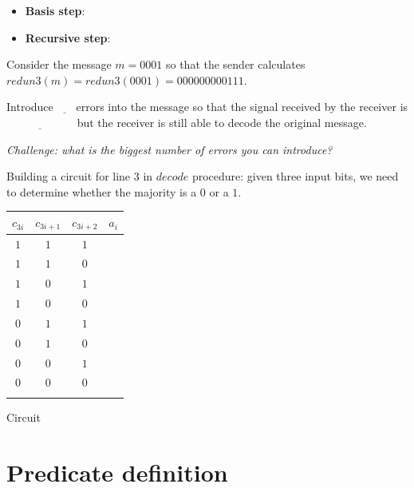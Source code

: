\documentclass[12pt, oneside]{article}
\begin{document}
\vspace{-20pt}

\begin{itemize}
\item[] {\bf Basis step}: \underline{ \phantom{$\lambda \in Out$ \qquad}}
\item[] {\bf Recursive step}: \underline{\phantom{If $x \in Out$ then $x000 \in Out$ and $x111 \in Out$} }
\end{itemize}


Consider the message $m = 0001$ so that the sender calculates $redun3(m) = redun3(0001) = 000000000111$.

Introduce $\underline{\phantom{~~4~~}} $
errors into the message so that the signal received by the 
receiver is $\underline{\phantom{010100010101}}$
but the receiver is still able to decode the original message.

\vspace{-10pt}

{\it Challenge: what is the biggest number of errors you can introduce?} 

Building a circuit for line 3 in $decode$ procedure: given three input bits, we need to determine whether the
majority is a $0$ or a $1$.

\begin{center}
\begin{multicols}{2}\begin{tabular}{ccc|c}
$c_{3i}$ & $c_{3i+1}$ & $c_{3i+2}$ & $a_i$ \\
\hline
$1$ & $1$ & $1$ & $\phantom{1}$ \\
$1$ & $1$ & $0$ & $\phantom{1}$ \\
$1$ & $0$ & $1$ & $\phantom{1}$ \\
$1$ & $0$ & $0$ & $\phantom{0}$ \\
$0$ & $1$ & $1$ & $\phantom{1}$ \\
$0$ & $1$ & $0$ & $\phantom{0}$ \\
$0$ & $0$ & $1$ & $\phantom{0}$ \\
$0$ & $0$ & $0$ & $\phantom{0}$ \\\\
\end{tabular}
\columnbreak

Circuit 
\end{multicols}
\end{center} \vfill
\section*{Predicate definition}
\end{document}
